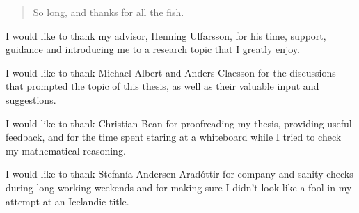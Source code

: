 \begin{quotation}
So long, and thanks for all the fish.
\end{quotation}
\vspace{\baselineskip}

I would like to thank my advisor, Henning Ulfarsson, for his time, support,
guidance and introducing me to a research topic that I greatly enjoy.

I would like to thank Michael Albert and Anders Claesson for the discussions that
prompted the topic of this thesis, as well as their valuable input and suggestions.

I would like to thank Christian Bean for proofreading my thesis, providing useful
feedback, and for the time spent staring at a whiteboard while I tried to check
my mathematical reasoning.

I would like to thank Stefanía Andersen Aradóttir for company and sanity checks
during long working weekends and for making sure I didn't look like a fool in my
attempt at an Icelandic title.
